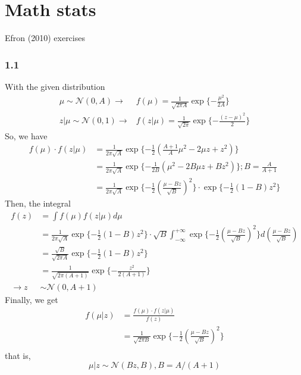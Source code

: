 \documentclass{article}
\begin{document}
\section*{Math stats}
Efron (2010) exercises

\subsubsection*{1.1}
With the given distribution
\begin{displaymath}
\begin{split}
\mu \sim \mathcal{N}(0,A) \rightarrow  &
f(\mu) = \frac{1}{\sqrt{2 \pi A}} \exp\{-\frac{\mu^2}{2A}\}  \\
z|\mu \sim \mathcal{N}(0,1) \rightarrow & 
f(z|\mu) = \frac{1}{\sqrt{2 \pi}} \exp\{-\frac{(z-\mu)^2}{2}\}
\end{split}
\end{displaymath}
So, we have
\begin{displaymath}
\begin{split}
f(\mu)\cdot f(z|\mu) &= \frac{1}{2\pi \sqrt{A}} \exp \{-\frac{1}{2}
(\frac{A+1}{A}\mu^2 - 2\mu z + z^2)\} \\
& = \frac{1}{2\pi \sqrt{A}} \exp \{-\frac{1}{2B}
(\mu^2 - 2B\mu z + Bz^2)\} ;       B=\frac{A}{A+1} \\
& = \frac{1}{2\pi \sqrt{A}} \exp \{-\frac{1}{2} (\frac{\mu -  Bz}{\sqrt{B}})^2\} 
\cdot \exp \{-\frac{1}{2} (1-B)z^2 \} 
\end{split}
\end{displaymath}
Then, the integral
\begin{displaymath}
\begin{split}
f(z) &= \int {f(\mu)f(z|\mu)} d\mu \\
& = \frac{1}{2\pi \sqrt{A}} \exp \{-\frac{1}{2} (1-B)z^2 \} 
\cdot \sqrt{B} \int_{-\infty}^{+\infty}  
\exp \{-\frac{1}{2} (\frac{\mu -  Bz}{\sqrt{B}})^2\} 
d (\frac{\mu -  Bz}{\sqrt{B}}) \\
& = \frac{\sqrt{B}}{\sqrt{2\pi A}} \exp \{-\frac{1}{2} (1-B)z^2 \} \\
& = \frac{1}{\sqrt{2\pi (A+1)}} \exp \{ -\frac{z^2}{2(A+1)} \} \\
\rightarrow  z & \sim \mathcal{N}(0,A+1)
\end{split}
\end{displaymath}
Finally, we get
\begin{displaymath}
\begin{split}
f(\mu |z) &= \frac{f(\mu)\cdot f(z|\mu)}{f(z)} \\
& = \frac{1}{\sqrt{2\pi B}} \exp \{-\frac{1}{2} (\frac{\mu -  Bz}{\sqrt{B}})^2\} \\
\end{split}
\end{displaymath}
that is, 
\begin{displaymath}
\mu |z \sim \mathcal{N}(Bz, B) , B= A/(A+1)
\end{displaymath}
\end{document}
